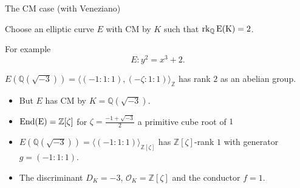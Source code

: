 \documentclass[handout]{beamer}
\newcommand{\qe}{\mathbb{Q}}
\begin{document}
\begin{frame}{The CM case (with Veneziano)}
\begin{alertblock} {Choose an elliptic curve $E$  with CM by $K$ such that $\rm{rk}_\mathbb{Q} \, E({K})=2$.  }\end{alertblock}

 For example  $$E : y^2=x^3+2.$$ 
   
 \pause
  
  \begin{alertblock} {$E(\qe(\sqrt{-3}))=\langle (-1:1:1),(-\zeta:1:1)\rangle_{\mathbb{Z}}$ has rank $2$ as an abelian group. }\end{alertblock}
  
  
  
 \pause
 

    \begin{itemize} \item But $E$ has CM by $K=\qe(\sqrt{-3})$.
    \item  $\rm{End}
    (E)=\mathbb{Z}[\zeta]$ for $\zeta=\frac{-1+\sqrt{-3}}{2}$ a primitive cube root of $1$ 
    
    \item $E(\qe(\sqrt{-3}))=\langle (-1:1:1)\rangle_{\mathbb{Z}[\zeta]}$ has $\mathbb{Z}[\zeta]$-rank $1$ with generator  $g=(-1:1:1)$.
    



   \item   The  discriminant $D_K=-3$,  $\mathcal{O}_K=\mathbb{Z}[\zeta]$ and the conductor $f=1$.\end{itemize}
 \end{frame}
\end{document}
